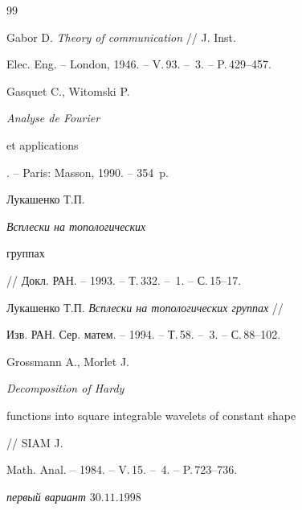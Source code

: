 \begin{thebibliography}{99}


Gabor D. {\em Theory of communication} // J. Inst.


Elec. Eng. -- London, 1946. -- V.\,93. -- \No\,3. -- P.\,429--457.




Gasquet C., Witomski P. {\em Analyse de Fourier


et applications}. -- Paris: Masson, 1990. -- 354~p.




Лукашенко Т.П. {\em Всплески на топологических


группах} // Докл. РАН. -- 1993. -- Т.\,332. -- \No\,1. -- С.\,15--17.




Лукашенко Т.П. {\em Всплески на топологических группах} // 


Изв. РАН. Сер. матем. -- 1994. -- Т.\,58. -- \No\,3. -- С.\,88--102.




Grossmann A., Morlet J. {\em Decomposition of Hardy


functions into square integrable wavelets of constant shape} // SIAM J.


Math. Anal. -- 1984. -- V.\,15. -- \No\,4. -- P.\,723--736.





\end{thebibliography}





\vskip 2cm







%


{\it первый вариант $30.11.1998$}




\label{end}








